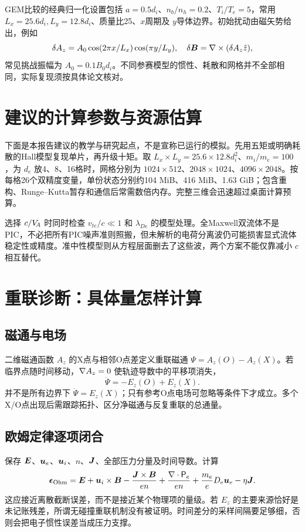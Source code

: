 \documentclass[UTF8,a4paper,11pt,openany,fontset=fandol]{ctexbook}
\begin{document}
GEM比较的经典归一化设置包括 $a=0.5d_i$、$n_b/n_h=0.2$、$T_i/T_e=5$，常用 $L_x=25.6d_i,L_y=12.8d_i$、质量比25、$x$周期及 $y$导体边界。初始扰动由磁矢势给出，例如
\begin{equation}\delta A_z=A_0\cos(2\pi x/L_x)\cos(\pi y/L_y),\quad \delta\bm{B}=\nabla\times(\delta A_z\hat z),
\end{equation}
常见挑战振幅为 $A_0=0.1B_0d_i$。不同参赛模型的惯性、耗散和网格并不全部相同，实际复现须按具体论文核对。\citep{Birn2001}


\section{建议的计算参数与资源估算}
下面是本报告建议的教学与研究起点，不是宣称已运行的模拟。先用五矩或明确耗散的Hall模型复现单片，再升级十矩。取 $L_x\times L_y=25.6\times12.8d_i^2$、$m_i/m_e=100$，为 $d_e$ 放4、8、16格时，网格分别为 $1024\times512$、$2048\times1024$、$4096\times2048$。按每格26个双精度变量，单份状态分别约104 MiB、416 MiB、1.63 GiB；包含重构、Runge--Kutta暂存和通信后常需数倍内存。完整三维会迅速超过桌面计算预算。

选择 $c/V_{\!A}$ 时同时检查 $v_{te}/c\ll1$ 和 $\lambda_{De}$ 的模型处理。全Maxwell双流体不是PIC，不必把所有PIC噪声准则照搬，但未解析的电荷分离波仍可能损害显式流体稳定性或精度。准中性模型则从方程层面删去了这些波，两个方案不能仅靠减小 $c$ 相互替代。

\section{重联诊断：具体量怎样计算}
\subsection{磁通与电场}
二维磁通函数 $A_z$ 的X点与相邻O点差定义重联磁通 $\Psi=A_z(O)-A_z(X)$。若临界点随时间移动，$\nabla A_z=0$ 使轨迹导数中的平移项消失，
\begin{equation}\dot\Psi=-E_z(O)+E_z(X).
\end{equation}
并不是所有边界下 $\dot\Psi=E_z(X)$；只有参考O点电场可忽略等条件下才成立。多个X/O点出现后需跟踪拓扑、区分净磁通与反复重联的总通量。

\subsection{欧姆定律逐项闭合}
保存 $\bm{E}$、$\bm{u}_e$、$\bm{u}_i$、$n$、$\bm{J}$、全部压力分量及时间导数。计算
\begin{equation}\bm{\epsilon}_{\rm Ohm}=\bm{E}+\bm{u}_i\times\bm{B}-{\bm{J}\times\bm{B}\over en}+{\nabla\cdot\mathsf P_e\over en}+{m_e\over e}D_e\bm{u}_e-\eta\bm{J}.
\end{equation}
这应接近离散截断误差，而不是接近某个物理项的量级。若 $E_z$ 的主要来源恰好是未记账残差，所谓无碰撞重联机制没有被证明。时间差分的采样间隔要足够细，否则会把电子惯性误差当成压力支撑。
\end{document}
